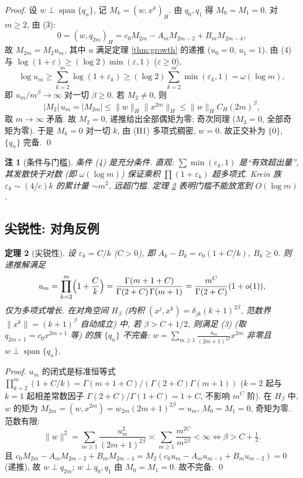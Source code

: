\documentclass[UTF8]{ctexart}
\newtheorem{theorem}{定理}[section]
\newtheorem{remark}[theorem]{注}
\begin{document}
\begin{proof}
	设 $w \perp \operatorname{span}\{q_n\}$, 记 $M_k = (w, x^k)_H$. 由 $q_0, q_1$
	得 $M_0 = M_1 = 0$. 对 $m \geq 2$, 由 (3):
	\[
		0 = (w, q_{2m})_H = c_0 M_{2m} - A_m M_{2m-2} + B_m M_{2m-4},
	\]
	故 $M_{2m} = M_2 u_m$, 其中 $u$ 满足定理 \ref{thm:growth} 的递推
	($u_0 = 0$, $u_1 = 1$). 由 (4) 与
	$\log(1+\varepsilon) \geq (\log 2)\min(\varepsilon, 1)$ ($\varepsilon \geq 0$),
	\[
		\log u_m \geq \sum_{k=2}^m \log(1+\varepsilon_k)
		\geq (\log 2)\sum_{k=2}^m \min(\varepsilon_k, 1) = \omega(\log m),
	\]
	即 $u_m/m^\beta \to \infty$ 对一切 $\beta \geq 0$. 若 $M_2 \neq 0$, 则
	\[
		|M_2|\, u_m = |M_{2m}| \leq \|w\|_H \|x^{2m}\|_H \leq \|w\|_H C_H (2m)^\beta,
	\]
	取 $m \to \infty$ 矛盾. 故 $M_2 = 0$, 递推给出全部偶矩为零; 奇次同理
	($M_3 = 0$, 全部奇矩为零). 于是 $M_k = 0$ 对一切 $k$, 由 (H1) 多项式稠密,
	$w = 0$. 故正交补为 $\{0\}$, $\{q_n\}$ 完备. \qed
\end{proof}

\begin{remark}[条件与门槛]
	条件 (4) 是充分条件. 直观: $\sum \min(\varepsilon_k,1)$ 是``有效超出量'',
	其发散快于对数 (即 $\omega(\log m)$) 保证乘积 $\prod(1+\varepsilon_k)$
	超多项式. Krein 族 $\varepsilon_k \sim (4/c)k$ 的累计量 $\sim m^2$,
	远超门槛. 定理 \ref{thm:sharp} 表明门槛不能放宽到 $O(\log m)$.
\end{remark}

\subsection{尖锐性: 对角反例}

\begin{theorem}[尖锐性]\label{thm:sharp}
	设 $\varepsilon_k = C/k$ ($C > 0$), 即 $A_k - B_k = c_0(1 + C/k)$,
	$B_k \geq 0$. 则递推解满足
	\begin{equation}
		u_m = \prod_{k=2}^m \Bigl(1 + \frac{C}{k}\Bigr)
		= \frac{\Gamma(m+1+C)}{\Gamma(2+C)\,\Gamma(m+1)} = \frac{m^C}{\Gamma(2+C)}(1+o(1)),
	\end{equation}
	仅为多项式增长. 在对角空间 $H_\beta$ (内积 $(x^j, x^k) = \delta_{jk}(k+1)^{2\beta}$,
	范数界 $\|x^k\| = (k+1)^\beta$ 自动成立) 中, 若 $\beta > C + 1/2$,
	则满足 (3) (取 $q_{2m+1} = c_0 x^{2m+1}$ 等) 的族 $\{q_n\}$ \emph{不完备}:
	$w = \sum_{m \geq 1} \frac{u_m}{(2m+1)^{2\beta}} x^{2m}$ 非零且
	$w \perp \operatorname{span}\{q_n\}$.
\end{theorem}

\begin{proof}
	$u_m$ 的闭式是标准恒等式 $\prod_{k=2}^m (1+C/k) = \Gamma(m+1+C)/(\Gamma(2+C)\Gamma(m+1))$
	($k=2$ 起与 $k=1$ 起相差常数因子 $\Gamma(2+C)/\Gamma(1+C) = 1+C$, 不影响 $m^C$ 阶).
	在 $H_\beta$ 中, $w$ 的矩为 $M_{2m} = (w, x^{2m}) = w_{2m}(2m+1)^{2\beta} = u_m$,
	$M_0 = M_1 = 0$, 奇矩为零. 范数有限:
	\[
		\|w\|^2 = \sum_{m \geq 1} \frac{u_m^2}{(2m+1)^{2\beta}} \asymp
		\sum_{m \geq 1} \frac{m^{2C}}{m^{2\beta}} < \infty \iff \beta > C + \tfrac12.
	\]
	且 $c_0 M_{2m} - A_m M_{2m-2} + B_m M_{2m-4} = M_2(c_0 u_m - A_m u_{m-1} + B_m u_{m-2}) = 0$
	(递推), 故 $w \perp q_{2m}$; $w \perp q_0, q_1$ 由 $M_0 = M_1 = 0$. 故不完备.
	\qed
\end{proof}
\end{document}
